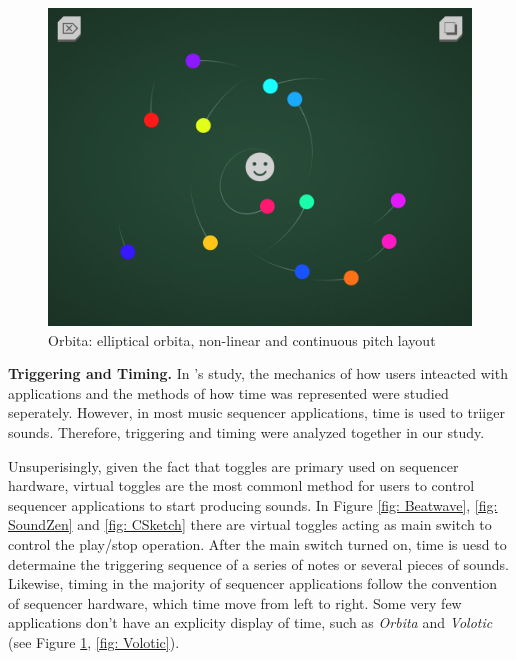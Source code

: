 \bigskip
\begin{figure}[h]
  \includegraphics[width=12 cm]{images/Orbita.PNG}
  \centering
  \caption{Orbita: elliptical orbita, non-linear and continuous pitch layout}
  \label{fig: Orbita}
\end{figure}
\bigskip

\textbf{Triggering and Timing.} In \citeauthor{Reference14}'s study, the mechanics of how users inteacted with applications and the methods of how time was represented were studied seperately. However, in most music sequencer applications, time is used to triiger sounds. Therefore, triggering and timing were analyzed together in our study.

Unsuperisingly, given the fact that toggles are primary used on sequencer hardware, virtual toggles are the most commonl method for users to control sequencer applications to start producing sounds. In Figure \ref{fig: Beatwave}, \ref{fig: SoundZen} and \ref{fig: CSketch} there are virtual toggles acting as main switch to control the play/stop operation. After the main switch turned on, time is uesd to determaine the triggering sequence of a series of notes or several pieces of sounds. Likewise, timing in the majority of sequencer applications follow the convention of sequencer hardware, which time move from left to right. Some very few applications don't have an explicity display of time, such as \textit{Orbita} and \textit{Volotic} (see Figure \ref{fig: Orbita}, \ref{fig: Volotic}).


